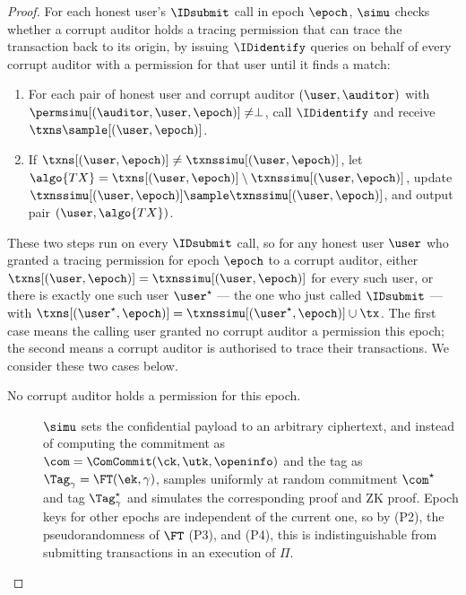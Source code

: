 \begin{proof}
  For each honest user's $\IDsubmit$ call in epoch $\epoch$, $\simu$ checks
  whether a corrupt auditor holds a tracing permission that can trace the
  transaction back to its origin, by issuing $\IDidentify$ queries on behalf of
  every corrupt auditor with a permission for that user until it finds a match:

  \begin{enumerate}

    \item For each pair of honest user and corrupt auditor $(\user, \auditor)$
      with $\permsimu[(\auditor,\user,\epoch)]\neq \perp$, call $\IDidentify$
      and receive $\txns \sample [(\user,\epoch)]$.

    \item If $\txns[(\user,\epoch)] \neq \txnssimu[(\user, \epoch)]$, let
      $\algo{TX} = \txns[(\user,\epoch)] \setminus \txnssimu[(\user, \epoch)]$,
      update  $\txnssimu[(\user, \epoch)] \sample \txnssimu[(\user, \epoch)]$,
      and output pair $(\user, \algo{TX})$.

  \end{enumerate}

  These two steps run on every $\IDsubmit$ call, so for any honest user $\user$
  who granted a tracing permission for epoch $\epoch$ to a corrupt auditor,
  either $\txns[(\user,\epoch)] = \txnssimu[(\user, \epoch)]$ for every such
  user, or there is exactly one such user $\user^\star$ — the one who just
  called $\IDsubmit$ — with $\txns[(\user^\star,\epoch)] =
  \txnssimu[(\user^{\star}, \epoch)] \cup \tx$. The first case means the
  calling user granted no corrupt auditor a permission this epoch; the second
  means a corrupt auditor is authorised to trace their transactions. We
  consider these two cases below.

  \begin{description}

    \item[No corrupt auditor holds a permission for this epoch.] $\simu$ sets
      the confidential payload to an arbitrary ciphertext, and instead of
      computing the commitment as $\com = \ComCommit(\ck, \utk, \openinfo)$ and
      the tag as $\Tag_\gamma = \FT(\ek,\gamma)$, samples uniformly at random
      commitment $\com^{\star}$ and tag $\Tag_{\gamma}^\star$ and simulates the
      corresponding proof and ZK proof. Epoch keys for other epochs are
      independent of the current one, so by (P2), the pseudorandomness of
      $\FT$ (P3), and (P4), this is indistinguishable from submitting
      transactions in an execution of $\Pi$.


\end{description}
\end{proof}
